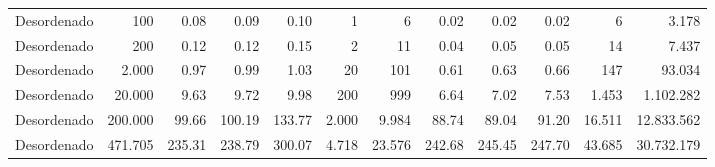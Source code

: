\documentclass[12pt,a4paper]{article}
\begin{document}
\begin{table}[H]
{\begin{tabular}{lr rrr rr rrr rr}
\midrule
Desordenado & 100 & 0.08 & 0.09 & 0.10 & 1 & 6 & 0.02 & 0.02 & 0.02 & 6 & 3.178 \\
Desordenado & 200 & 0.12 & 0.12 & 0.15 & 2 & 11 & 0.04 & 0.05 & 0.05 & 14 & 7.437 \\
Desordenado & 2.000 & 0.97 & 0.99 & 1.03 & 20 & 101 & 0.61 & 0.63 & 0.66 & 147 & 93.034 \\
Desordenado & 20.000 & 9.63 & 9.72 & 9.98 & 200 & 999 & 6.64 & 7.02 & 7.53 & 1.453 & 1.102.282 \\
Desordenado & 200.000 & 99.66 & 100.19 & 133.77 & 2.000 & 9.984 & 88.74 & 89.04 & 91.20 & 16.511 & 12.833.562 \\
Desordenado & 471.705 & 235.31 & 238.79 & 300.07 & 4.718 & 23.576 & 242.68 & 245.45 & 247.70 & 43.685 & 30.732.179 \\
\bottomrule
\end{tabular}%
}
\end{table}
\end{document}
